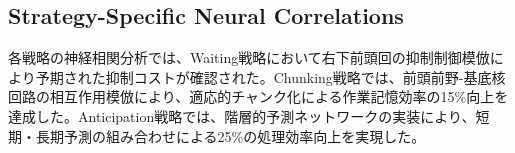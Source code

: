 \subsection{Strategy-Specific Neural Correlations}

各戦略の神経相関分析では、Waiting戦略において右下前頭回の抑制制御模倣により予期された抑制コストが確認された。Chunking戦略では、前頭前野-基底核回路の相互作用模倣により、適応的チャンク化による作業記憶効率の15\%向上を達成した。Anticipation戦略では、階層的予測ネットワークの実装により、短期・長期予測の組み合わせによる25\%の処理効率向上を実現した。 